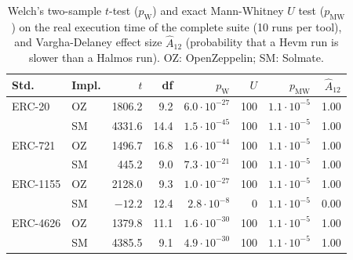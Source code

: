 \begin{table}[!htbp]
\centering
\footnotesize
\setlength{\tabcolsep}{3pt}
\begin{tabular}{@{}llrrrrrr@{}}
\toprule
\textbf{Std.} & \textbf{Impl.} & $t$ & df & $p_{\mathrm{W}}$ & $U$ & $p_{\mathrm{MW}}$ & $\hat{A}_{12}$ \\
\midrule
ERC-20   & OZ & 1806.2 & 9.2 & $6.0{\cdot}10^{-27}$ & 100 & $1.1{\cdot}10^{-5}$ & 1.00 \\
         & SM & 4331.6 & 14.4 & $1.5{\cdot}10^{-45}$ & 100 & $1.1{\cdot}10^{-5}$ & 1.00 \\
ERC-721  & OZ & 1496.7 & 16.8 & $1.6{\cdot}10^{-44}$ & 100 & $1.1{\cdot}10^{-5}$ & 1.00 \\
         & SM & 445.2 & 9.0 & $7.3{\cdot}10^{-21}$ & 100 & $1.1{\cdot}10^{-5}$ & 1.00 \\
ERC-1155 & OZ & 2128.0 & 9.3 & $1.0{\cdot}10^{-27}$ & 100 & $1.1{\cdot}10^{-5}$ & 1.00 \\
         & SM & $-12.2$ & 12.4 & $2.8{\cdot}10^{-8}$ & 0 & $1.1{\cdot}10^{-5}$ & 0.00 \\
ERC-4626 & OZ & 1379.8 & 11.1 & $1.6{\cdot}10^{-30}$ & 100 & $1.1{\cdot}10^{-5}$ & 1.00 \\
         & SM & 4385.5 & 9.1 & $4.9{\cdot}10^{-30}$ & 100 & $1.1{\cdot}10^{-5}$ & 1.00 \\
\bottomrule
\end{tabular}
\caption{Welch's two-sample $t$-test ($p_{\mathrm{W}}$) and exact Mann-Whitney $U$ test ($p_{\mathrm{MW}}$) on the real execution time of the complete suite (10 runs per tool), and Vargha-Delaney effect size $\hat{A}_{12}$ (probability that a Hevm run is slower than a Halmos run). OZ: OpenZeppelin; SM: Solmate.}
\label{tab:stats}
\end{table}
